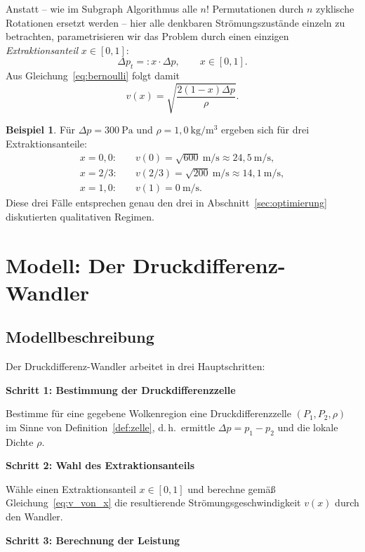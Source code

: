 ﻿\documentclass[a4paper,12pt]{article}
\theoremstyle{definition}
\newtheorem{beispiel}{Beispiel}
\begin{document}
Anstatt -- wie im Subgraph Algorithmus alle $n!$ Permutationen durch $n$
zyklische Rotationen ersetzt werden -- hier alle denkbaren
Strömungszustände einzeln zu betrachten, parametrisieren wir das Problem
durch einen einzigen \emph{Extraktionsanteil} $x \in [0,1]$:
\[
	\Delta p_t =: x \cdot \Delta p, \qquad x \in [0,1].
\]
Aus Gleichung~\eqref{eq:bernoulli} folgt damit
\begin{equation}
	\label{eq:v_von_x}
	v(x) = \sqrt{\frac{2(1-x)\Delta p}{\rho}}.
\end{equation}

\begin{beispiel}
	\label{bsp:rotation}
	Für $\Delta p = 300\ \mathrm{Pa}$ und $\rho = 1{,}0\ \mathrm{kg/m^3}$
	ergeben sich für drei Extraktionsanteile:
	\begin{align*}
		x=0{,}0:&\quad v(0) = \sqrt{600}\ \mathrm{m/s} \approx 24{,}5\ \mathrm{m/s}, \\
		x=2/3:&\quad v(2/3) = \sqrt{200}\ \mathrm{m/s} \approx 14{,}1\ \mathrm{m/s}, \\
		x=1{,}0:&\quad v(1) = 0\ \mathrm{m/s}.
	\end{align*}
	Diese drei Fälle entsprechen genau den drei in
	Abschnitt~\ref{sec:optimierung} diskutierten qualitativen Regimen.
\end{beispiel}

\section{Modell: Der Druckdifferenz-Wandler}

\subsection{Modellbeschreibung}

Der Druckdifferenz-Wandler arbeitet in drei Hauptschritten:

\textbf{Schritt 1: Bestimmung der Druckdifferenzzelle}

Bestimme für eine gegebene Wolkenregion eine Druckdifferenzzelle
$(P_1, P_2, \rho)$ im Sinne von Definition~\ref{def:zelle}, d.\,h.\
ermittle $\Delta p = p_1 - p_2$ und die lokale Dichte $\rho$.

\textbf{Schritt 2: Wahl des Extraktionsanteils}

Wähle einen Extraktionsanteil $x \in [0,1]$ und berechne gemäß
Gleichung~\eqref{eq:v_von_x} die resultierende Strömungsgeschwindigkeit
$v(x)$ durch den Wandler.

\textbf{Schritt 3: Berechnung der Leistung}
\end{document}
